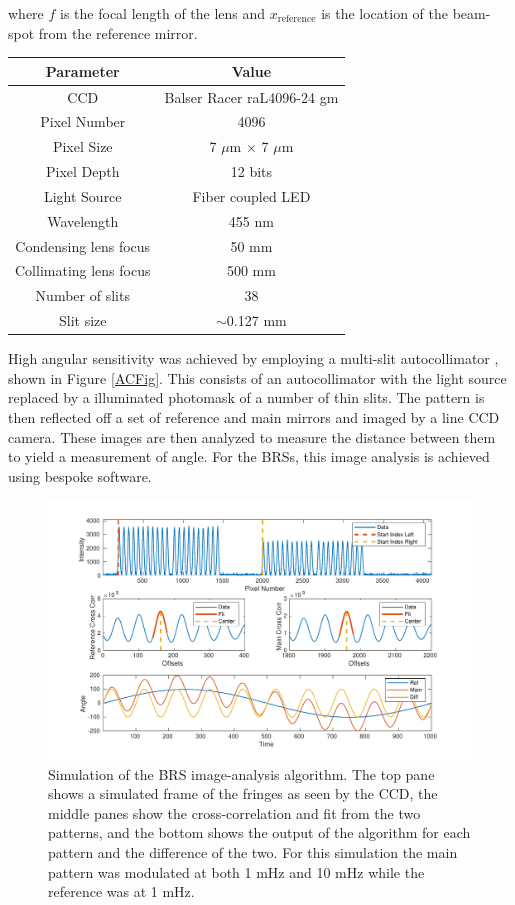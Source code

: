 \documentclass [12pt, proquest]{uwthesis}[2019]
\begin{document}
where $f$ is the focal length of the lens and $x_\text{reference}$ is the location of the beam-spot from the reference mirror.

\begin{center}
\begin{tabular}{| c | c |}
\hline
Parameter & Value\\
\hline \hline
CCD & Balser Racer raL4096-24 gm\\
Pixel Number & 4096\\
Pixel Size & 7 $\mu$m $\times$ 7 $\mu$m\\
Pixel Depth & 12 bits\\
Light Source & Fiber coupled LED\\
Wavelength & 455 nm\\
Condensing lens focus & 50 mm\\
Collimating lens focus & 500 mm\\
Number of slits & 38\\
Slit size & $\sim$0.127 mm\\
\hline
\end{tabular}
\label{ACTable}
\end{center}

High angular sensitivity was achieved by employing a multi-slit autocollimator \cite{MSA}, shown in Figure \ref{ACFig}. This consists of an autocollimator with the light source replaced by a illuminated photomask of a number of thin slits. The pattern is then reflected off a set of reference and main mirrors and imaged by a line CCD camera. These images are then analyzed to measure the distance between them to yield a measurement of angle. For the BRSs, this image analysis is achieved using bespoke software.\cite{BRSReadout}


\begin{figure}[!h]
\begin{center}
 \includegraphics[width=\textwidth]{BRS_ImgAnalysis.pdf}
\caption[Simulation of the BRS image analysis algorithm]{Simulation of the BRS image-analysis algorithm. The top pane shows a simulated frame of the fringes as seen by the CCD, the middle panes show the cross-correlation and fit from the two patterns, and the bottom shows the output of the algorithm for each pattern and the difference of the two. For this simulation the main pattern was modulated at both 1 mHz and 10 mHz while the reference was at 1 mHz.}
\label{ImgAnalysis}
\end{center}
\end{figure}
\end{document}
